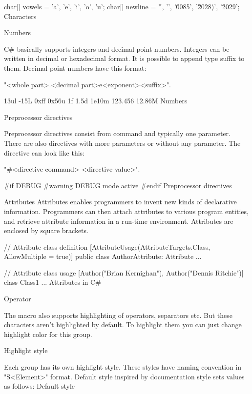 \begtt
char[] vowels = {'a', 'e', 'i', 'o', 'u'};
char[] newline = {'\r', '\n', '\u0085', '\u2028)', '\u2029'};
\endtt
\priklad Characters

\secc Numbers

C\# basically supports integers and decimal point numbers.
Integers can be written in decimal or hexadecimal format.
It is possible to append type suffix to them.
Decimal point numbers have this format:

"<whole part>.<decimal part>e<exponent><suffix>".

         13ul         -15L       0xff         0x56u
    1f         1.5d        1e10m    123.456        12.86M
\endtt
\priklad Numbers

\sec Preprocessor directives

Preprocessor directives consist from command and typically one parameter.
There are also directives with more parameters or without any parameter.
The directive can look like this:

"#<directive command> <directive value>".

\begtt
#if DEBUG
#warning DEBUG mode active
#endif
\endtt
\priklad Preprocessor directives

\sec Attributes
Attributes enables programmers to invent new kinds of declarative information.
Programmers can then attach attributes to various program entities, and retrieve attribute information in a run-time environment.
Attributes are enclosed by square brackets.

\begtt
// Attribute class definition
[AttributeUsage(AttributeTargets.Class, AllowMultiple = true)]
public class AuthorAttribute: Attribute
{ ... }

// Attribute class usage
[Author("Brian Kernighan"), Author("Dennis Ritchie")]
class Class1
{ ... }
\endtt
\priklad Attributes in C\#

\sec Operator

The macro also supports highlighting of operators, separators etc.
But these characters aren't highlighted by default.
To highlight them you can just change highlight color for this group.

\chap Highlight style

Each group has its own highlight style.
These styles have naming convention in "S<Element>" format.
Default style inspired by documentation style sets values as follows:
\midinsert
{}
\begtt
\let\SComment=\Green      %
\let\SDocComment=\Grey    %
\let\SPreprocKW=\Magenta  %
\let\SPreprocVal=\Magenta %
\let\SKeyword=\Blue       %
\let\SAttribute=\Cyan     %
\let\SLiteral=\Cyan       %
\let\SString=\Red         %
\let\SChar=\Red           %
\let\SNumber=\Black       %
\let\SOper=\Black         %
\endtt
\priklad Default style
\endinsert

